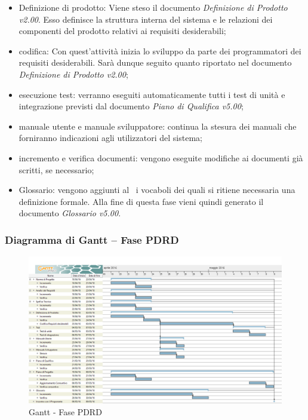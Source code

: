 \documentclass[../PianoProgetto.tex]{subfiles}
\begin{document}
		\begin{itemize}
			\item Definizione di prodotto: Viene steso il documento \textit{Definizione di Prodotto v2.00}. Esso definisce la struttura interna del sistema e le relazioni dei componenti del prodotto relativi ai requisiti desiderabili;

			\item codifica: Con quest'attività inizia lo sviluppo da parte dei programmatori dei requisiti desiderabili. Sarà dunque seguito quanto riportato nel documento \textit{Definizione di Prodotto v2.00};

	 		\item esecuzione test: verranno eseguiti automaticamente tutti i test di unità e integrazione previsti dal documento \textit{Piano di Qualifica v5.00};

			\item manuale utente e manuale sviluppatore: continua la stesura dei manuali che forniranno indicazioni agli utilizzatori del sistema;

			\item incremento e verifica documenti: vengono eseguite modifiche ai documenti già scritti, se necessario;

			\item Glossario: vengono aggiunti al \glossario\ i vocaboli dei quali si ritiene necessaria una definizione formale. Alla fine di questa fase vieni quindi generato il documento \textit{Glossario v5.00}.
		\end{itemize}
		\newpage
		\subsubsection{Diagramma di Gantt – Fase PDRD}
			\begin{figure}[!h]
				\centering
				\includegraphics[width=\textwidth]{gantt_png/5-requisiti_desiderabili}
				\caption{Gantt - Fase PDRD}
				\label{fig:Gantt - Fase PDRD}
			\end{figure}
			
\end{document}
